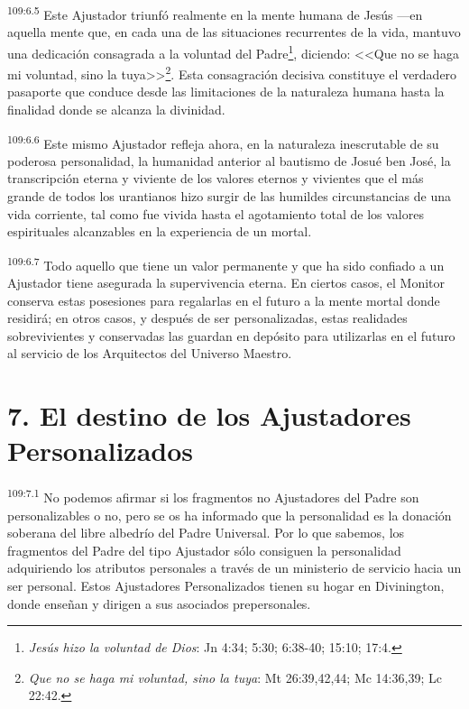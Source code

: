 \documentclass[twoside, 11pt]{book}
\begin{document}
\par
\textsuperscript{109:6.5} Este Ajustador triunfó realmente en la mente humana de Jesús ---en aquella mente que, en cada una de las situaciones recurrentes de la vida, mantuvo una dedicación consagrada a la voluntad del Padre\footnote{\textit{Jesús hizo la voluntad de Dios}: Jn 4:34; 5:30; 6:38-40; 15:10; 17:4.}, diciendo: <<Que no se haga mi voluntad, sino la tuya>>\footnote{\textit{Que no se haga mi voluntad, sino la tuya}: Mt 26:39,42,44; Mc 14:36,39; Lc 22:42.}. Esta consagración decisiva constituye el verdadero pasaporte que conduce desde las limitaciones de la naturaleza humana hasta la finalidad donde se alcanza la divinidad.

\par
\textsuperscript{109:6.6} Este mismo Ajustador refleja ahora, en la naturaleza inescrutable de su poderosa personalidad, la humanidad anterior al bautismo de Josué ben José, la transcripción eterna y viviente de los valores eternos y vivientes que el más grande de todos los urantianos hizo surgir de las humildes circunstancias de una vida corriente, tal como fue vivida hasta el agotamiento total de los valores espirituales alcanzables en la experiencia de un mortal.

\par
\textsuperscript{109:6.7} Todo aquello que tiene un valor permanente y que ha sido confiado a un Ajustador tiene asegurada la supervivencia eterna. En ciertos casos, el Monitor conserva estas posesiones para regalarlas en el futuro a la mente mortal donde residirá; en otros casos, y después de ser personalizadas, estas realidades sobrevivientes y conservadas las guardan en depósito para utilizarlas en el futuro al servicio de los Arquitectos del Universo Maestro.

\section*{7. El destino de los Ajustadores Personalizados}
\par
\textsuperscript{109:7.1} No podemos afirmar si los fragmentos no Ajustadores del Padre son personalizables o no, pero se os ha informado que la personalidad es la donación soberana del libre albedrío del Padre Universal. Por lo que sabemos, los fragmentos del Padre del tipo Ajustador sólo consiguen la personalidad adquiriendo los atributos personales a través de un ministerio de servicio hacia un ser personal. Estos Ajustadores Personalizados tienen su hogar en Divinington, donde enseñan y dirigen a sus asociados prepersonales.
\end{document}
